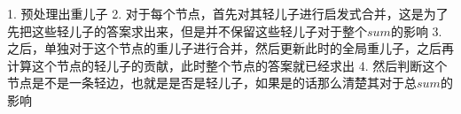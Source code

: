 1. 预处理出重儿子
2. 对于每个节点，首先对其轻儿子进行启发式合并，这是为了先把这些轻儿子的答案求出来，但是并不保留这些轻儿子对于整个$sum$的影响
3. 之后，单独对于这个节点的重儿子进行合并，然后更新此时的全局重儿子，之后再计算这个节点的轻儿子的贡献，此时整个节点的答案就已经求出
4. 然后判断这个节点是不是一条轻边，也就是是否是轻儿子，如果是的话那么清楚其对于总$sum$的影响